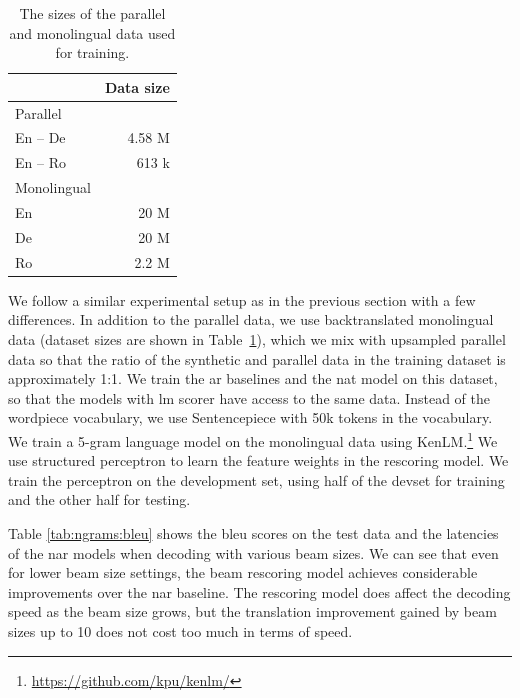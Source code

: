 \begin{table}
  \centering
  \begin{tabular}{lr}
    \toprule
    & Data size \\
    \midrule
    Parallel & \\
    En -- De & 4.58 M \\
    En -- Ro & 613 k \\
    \addlinespace
    Monolingual & \\
    En & 20 M \\
    De & 20 M \\
    Ro & 2.2 M \\
    \bottomrule
  \end{tabular}

  \caption{The sizes of the parallel and monolingual data used for training.}%
  \label{tab:ngrams:data}
\end{table}

We follow a similar experimental setup as in the previous section with a few
differences. In addition to the parallel data, we use backtranslated
monolingual data (dataset sizes are shown in Table~\ref{tab:ngrams:data}),
which we mix with upsampled parallel data so that the ratio of the synthetic
and parallel data in the training dataset is approximately 1:1. We train the
\ac{ar} baselines and the \ac{nat} model on this dataset, so that the models
with \ac{lm} scorer have access to the same data.  Instead of the wordpiece
vocabulary, we use Sentencepiece \citep{kudo-richardson-2018-sentencepiece}
with 50k tokens in the vocabulary.  We train a 5-gram language model on the
monolingual data using KenLM.\footnote{\url{https://github.com/kpu/kenlm/}}
We use structured perceptron \citep{huang-etal-2012-structured} to learn the
feature weights in the rescoring model. We train the perceptron on the
development set, using half of the devset for training and the other half for
testing.

Table \ref{tab:ngrams:bleu} shows the \acs{bleu} scores on the test data and
the latencies of the \ac{nar} models when decoding with various beam sizes. We
can see that even for lower beam size settings, the beam rescoring model
achieves considerable improvements over the \ac{nar} baseline. The rescoring
model does affect the decoding speed as the beam size grows, but the
translation improvement gained by beam sizes up to 10 does not cost too much in
terms of speed.

